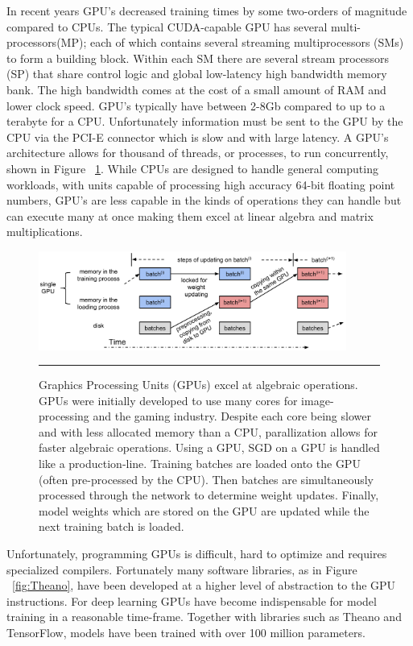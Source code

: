 In recent years GPU's decreased training times by some two-orders of magnitude compared to CPUs\citep{ciresan2012multi}.
The typical CUDA-capable\citep{cuda} GPU has several multi-processors(MP)\citep{chen2014big}; each of which contains several streaming multiprocessors (SMs) to form a building block.
Within each SM there are several stream processors (SP) that share control logic and global low-latency high bandwidth memory bank.
The high bandwidth comes at the cost of a small amount of RAM and lower clock speed.
GPU's typically have between 2-8Gb compared to up to a terabyte for a CPU.
Unfortunately information must be sent to the GPU by the CPU via the PCI-E connector which is slow and with large latency.
A GPU's architecture allows for thousand of threads, or processes, to run concurrently, shown in Figure ~\ref{fig:GPU_and_CPU}.
While CPUs are designed to handle general computing workloads, with units capable of processing high accuracy 64-bit floating point numbers, GPU's are less capable in the kinds of operations they can handle but can execute many at once making them excel at linear algebra and matrix multiplications.
\begin{figure}[htbp]
	\centering
		\includegraphics[width = 0.9\textwidth]{./Figures/Theano_based_large_scale_cisual_gpu_and_cpu_process.jpg}
		\rule{35em}{0.5pt}
	\caption[GPU Parallelized Training]{Graphics Processing Units (GPUs) excel at algebraic operations. GPUs were initially developed to use many cores for image-processing and the gaming industry. Despite each core being slower and with less allocated memory than a CPU, parallization allows for faster algebraic operations. Using a GPU, SGD on a GPU is handled like a production-line. Training batches are loaded onto the GPU (often pre-processed by the CPU). Then batches are simultaneously processed through the network to determine weight updates. Finally, model weights which are stored on the GPU are updated while the next training batch is loaded.
	\citep{neuralnetworkswebsite}}
	\label{fig:GPU_and_CPU}
\end{figure}


Unfortunately, programming GPUs is difficult, hard to optimize and requires specialized compilers.
Fortunately many software libraries, as in Figure ~\ref{fig:Theano}, have been developed at a higher level of abstraction to the GPU instructions.
For deep learning GPUs have become indispensable for model training in a reasonable time-frame. 
Together with libraries such as Theano and TensorFlow, models have been trained with over 100 million parameters.

